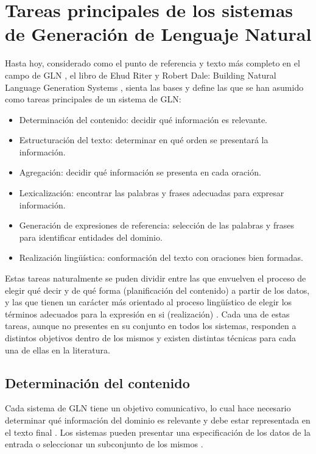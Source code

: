 \section{Tareas principales de los sistemas de Generación de Lenguaje Natural}

    Hasta hoy, considerado como el punto de referencia y texto más completo en el campo de GLN , el libro de Ehud Riter y
Robert Dale: Building Natural Language Generation Systems , sienta las bases y define las que se han asumido como tareas principales 
de un sistema de GLN:

\begin{itemize}
    \item Determinación del contenido: decidir qué información es relevante.
    \item Estructuración del texto: determinar en qué orden se presentará la información.
    \item Agregación: decidir qué información se presenta en cada oración.
    \item Lexicalización: encontrar las palabras y frases adecuadas para expresar información.
    \item Generación de expresiones de referencia: selección de las palabras y frases para identificar entidades del dominio.
    \item Realización lingüística: conformación del texto con oraciones bien formadas.
\end{itemize}


Estas tareas naturalmente se puden dividir entre las que envuelven el proceso de elegir qué decir y de qué forma (planificación del contenido) 
a partir de los datos, y las que tienen un carácter más orientado al proceso lingüístico de elegir los términos adecuados para la expresión 
en si (realización) . Cada una de estas tareas, aunque no presentes en su conjunto en todos los sistemas,  responden a distintos 
objetivos dentro de los mismos y existen distintas técnicas para cada una de ellas en la literatura.
    
\subsection{Determinación del contenido}\label{subsection:selecciondelcontenido}

    Cada sistema de GLN tiene un objetivo comunicativo, lo cual hace necesario determinar qué información del dominio es relevante y debe 
estar representada en el texto final . Los sistemas pueden presentar una especificación de los datos de la entrada 
o seleccionar un subconjunto de los mismos .


